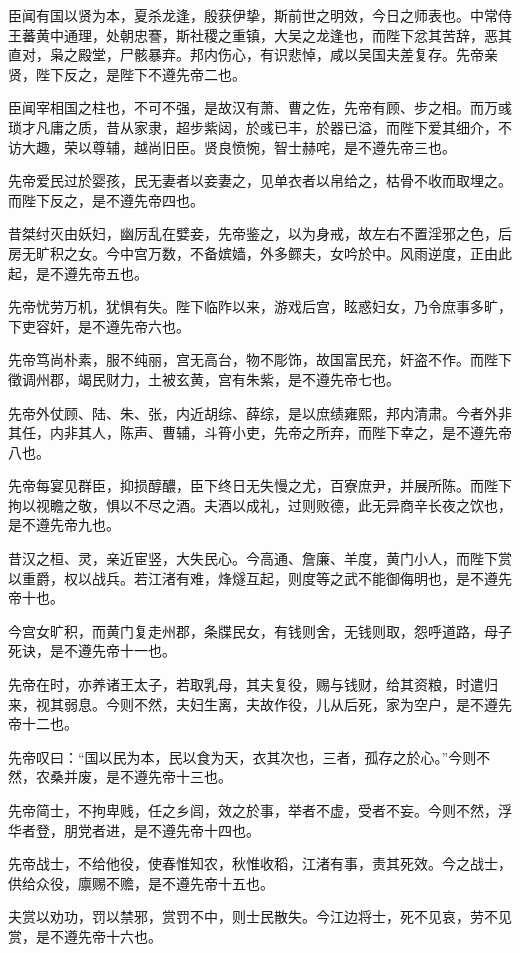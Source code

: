 \documentclass[12pt,UTF8]{ctexbook}
\begin{document}
臣闻有国以贤为本，夏杀龙逢，殷获伊挚，斯前世之明效，今日之师表也。中常侍王蕃黄中通理，处朝忠謇，斯社稷之重镇，大吴之龙逢也，而陛下忿其苦辞，恶其直对，枭之殿堂，尸骸暴弃。邦内伤心，有识悲悼，咸以吴国夫差复存。先帝亲贤，陛下反之，是陛下不遵先帝二也。

臣闻宰相国之柱也，不可不强，是故汉有萧、曹之佐，先帝有顾、步之相。而万彧琐才凡庸之质，昔从家隶，超步紫闼，於彧已丰，於器已溢，而陛下爱其细介，不访大趣，荣以尊辅，越尚旧臣。贤良愤惋，智士赫咤，是不遵先帝三也。

先帝爱民过於婴孩，民无妻者以妾妻之，见单衣者以帛给之，枯骨不收而取埋之。而陛下反之，是不遵先帝四也。

昔桀纣灭由妖妇，幽厉乱在嬖妾，先帝鉴之，以为身戒，故左右不置淫邪之色，后房无旷积之女。今中宫万数，不备嫔嫱，外多鳏夫，女吟於中。风雨逆度，正由此起，是不遵先帝五也。

先帝忧劳万机，犹惧有失。陛下临阼以来，游戏后宫，眩惑妇女，乃令庶事多旷，下吏容奸，是不遵先帝六也。

先帝笃尚朴素，服不纯丽，宫无高台，物不彫饰，故国富民充，奸盗不作。而陛下徵调州郡，竭民财力，土被玄黄，宫有朱紫，是不遵先帝七也。

先帝外仗顾、陆、朱、张，内近胡综、薛综，是以庶绩雍熙，邦内清肃。今者外非其任，内非其人，陈声、曹辅，斗筲小吏，先帝之所弃，而陛下幸之，是不遵先帝八也。

先帝每宴见群臣，抑损醇醲，臣下终日无失慢之尤，百寮庶尹，并展所陈。而陛下拘以视瞻之敬，惧以不尽之酒。夫酒以成礼，过则败德，此无异商辛长夜之饮也，是不遵先帝九也。

昔汉之桓、灵，亲近宦竖，大失民心。今高通、詹廉、羊度，黄门小人，而陛下赏以重爵，权以战兵。若江渚有难，烽燧互起，则度等之武不能御侮明也，是不遵先帝十也。

今宫女旷积，而黄门复走州郡，条牒民女，有钱则舍，无钱则取，怨呼道路，母子死诀，是不遵先帝十一也。

先帝在时，亦养诸王太子，若取乳母，其夫复役，赐与钱财，给其资粮，时遣归来，视其弱息。今则不然，夫妇生离，夫故作役，儿从后死，家为空户，是不遵先帝十二也。

先帝叹曰：“国以民为本，民以食为天，衣其次也，三者，孤存之於心。”今则不然，农桑并废，是不遵先帝十三也。

先帝简士，不拘卑贱，任之乡闾，效之於事，举者不虚，受者不妄。今则不然，浮华者登，朋党者进，是不遵先帝十四也。

先帝战士，不给他役，使春惟知农，秋惟收稻，江渚有事，责其死效。今之战士，供给众役，廪赐不赡，是不遵先帝十五也。

夫赏以劝功，罚以禁邪，赏罚不中，则士民散失。今江边将士，死不见哀，劳不见赏，是不遵先帝十六也。
\end{document}
